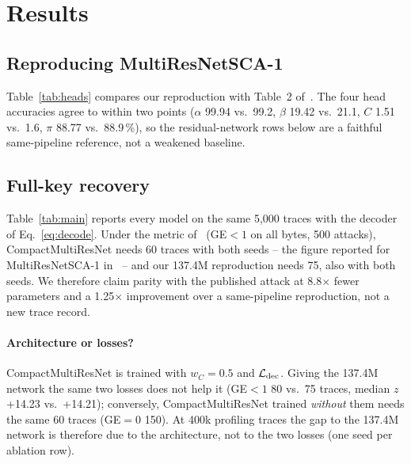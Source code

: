 \section{Results}
\label{sec:results}

\subsection{Reproducing MultiResNetSCA-1}
Table~\ref{tab:heads} compares our reproduction with Table~2 of~\cite{MS23}. The four head
accuracies agree to within two points ($\alpha$ 99.94 vs.\ 99.2, $\beta$ 19.42 vs.\ 21.1, $C$ 1.51
vs.\ 1.6, $\pi$ 88.77 vs.\ 88.9\,\%), so the residual-network rows below are a faithful same-pipeline
reference, not a weakened baseline.

\begin{table}[t]
\centering
\caption{Test accuracy of each head on 5,000 attack traces ($C$ and $\pi$: mean over the 16 heads;
$C$ gain: mean log-likelihood of the true label minus that of a uniform guess).}
\label{tab:heads}
\resizebox{\linewidth}{!}{}
\end{table}

\subsection{Full-key recovery}
Table~\ref{tab:main} reports every model on the same 5,000 traces with the decoder of
Eq.~\eqref{eq:decode}. Under the metric of~\cite{MS23} (GE$<1$ on all bytes, 500 attacks),
CompactMultiResNet needs 60 traces with both seeds -- the figure reported for MultiResNetSCA-1
in~\cite{MS23} -- and our 137.4M reproduction needs 75, also with both seeds. We therefore claim parity with the published
attack at 8.8$\times$ fewer parameters and a 1.25$\times$ improvement over a same-pipeline
reproduction, not a new trace record.

\begin{table}[t]
\centering
\caption{Full-key recovery on 5,000 ASCADv2 attack traces, 400k profiling traces, independent
permutation heads. Metrics as defined in Section~\ref{sec:metrics}; GE columns over 500 attacks.}
\label{tab:main}
\resizebox{\linewidth}{!}{}
\end{table}

\paragraph{Architecture or losses?} CompactMultiResNet is trained with $w_C=0.5$ and $\mathcal{L}_{\mathrm{dec}}$. Giving
the 137.4M network the same two losses does not help it (GE$<1$ 80 vs.\ 75 traces, median $z$
+14.23 vs.\ +14.21); conversely, CompactMultiResNet trained \emph{without} them needs the same 60
traces (GE$=0$ 150). At 400k profiling traces the gap to the 137.4M network is therefore due to the
architecture, not to the two losses (one seed per ablation row).

